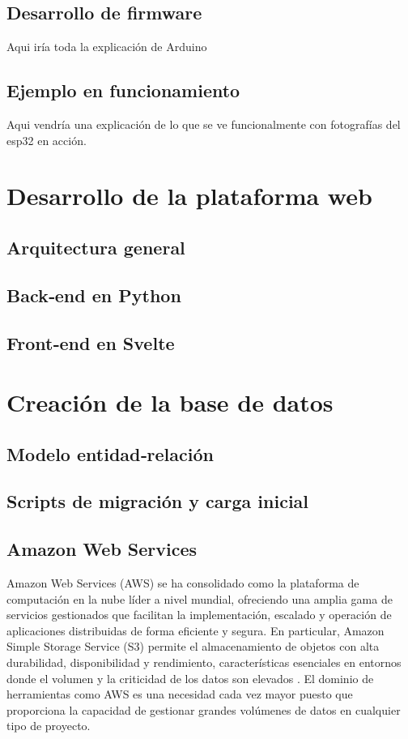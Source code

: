 \documentclass[12pt, a4paper]{article}
\begin{document}
	
	\subsection{Desarrollo de firmware}
	
	Aqui iría toda la explicación de Arduino
	
	\subsection{Ejemplo en funcionamiento}
	
	Aqui vendría una explicación de lo que se ve funcionalmente con fotografías del esp32 en acción.

\section{Desarrollo de la plataforma web}
	\subsection{Arquitectura general}
	\subsection{Back‑end en Python}
	\subsection{Front‑end en Svelte}

\section{Creación de la base de datos}
	\subsection{Modelo entidad‑relación}
	\subsection{Scripts de migración y carga inicial}
	
	\subsection{Amazon Web Services}
	
	Amazon Web Services (AWS) se ha consolidado como la plataforma de computación en la nube líder a nivel mundial, ofreciendo una amplia gama de servicios gestionados que facilitan la implementación, escalado y operación de aplicaciones distribuidas de forma eficiente y segura. En particular, Amazon Simple Storage Service (S3) permite el almacenamiento de objetos con alta durabilidad, disponibilidad y rendimiento, características esenciales en entornos donde el volumen y la criticidad de los datos son elevados \cite{awss3}. El dominio de herramientas como AWS es una necesidad cada vez mayor puesto que proporciona la capacidad de gestionar grandes volúmenes de datos en cualquier tipo de proyecto.
	
\end{document}
